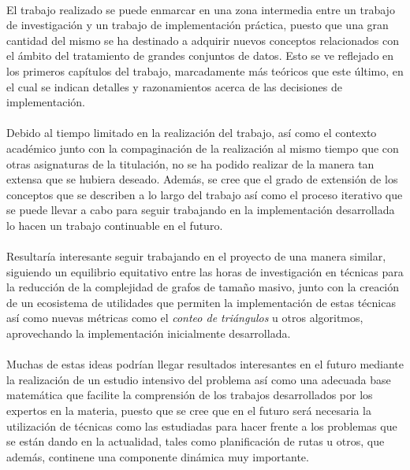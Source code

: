 \documentclass{subfiles}
\begin{document}
      \paragraph{}
      El trabajo realizado se puede enmarcar en una zona intermedia entre un trabajo de investigación y un trabajo de implementación práctica, puesto que una gran cantidad del mismo se ha destinado a adquirir nuevos conceptos relacionados con el ámbito del tratamiento de grandes conjuntos de datos. Esto se ve reflejado en los primeros capítulos del trabajo, marcadamente más teóricos que este último, en el cual se indican detalles y razonamientos acerca de las decisiones de implementación.

      \paragraph{}
      Debido al tiempo limitado en la realización del trabajo, así como el contexto académico junto con la compaginación de la realización al mismo tiempo que con otras asignaturas de la titulación, no se ha podido realizar de la manera tan extensa que se hubiera deseado. Además, se cree que el grado de extensión de los conceptos que se describen a lo largo del trabajo así como el proceso iterativo que se puede llevar a cabo para seguir trabajando en la implementación desarrollada lo hacen un trabajo continuable en el futuro.

      \paragraph{}
      Resultaría interesante seguir trabajando en el proyecto de una manera similar, siguiendo un equilibrio equitativo entre las horas de investigación en técnicas para la reducción de la complejidad de grafos de tamaño masivo, junto con la creación de un ecosistema de utilidades que permiten la implementación de estas técnicas así como nuevas métricas como el \emph{conteo de triángulos} u otros algoritmos, aprovechando la implementación inicialmente desarrollada.

      \paragraph{}
      Muchas de estas ideas podrían llegar resultados interesantes en el futuro mediante la realización de un estudio intensivo del problema así como una adecuada base matemática que facilite la comprensión de los trabajos desarrollados por los expertos en la materia, puesto que se cree que en el futuro será necesaria la utilización de técnicas como las estudiadas para hacer frente a los problemas que se están dando en la actualidad, tales como planificación de rutas u otros, que además, continene una componente dinámica muy importante.
\end{document}
